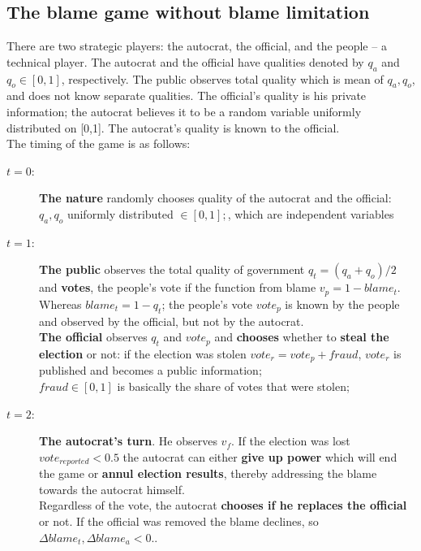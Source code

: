 \documentclass[a4paper, 12pt]{article}
\begin{document}
    \subsection*{The blame game without blame limitation}
	There are two strategic players: the autocrat, the official, and the people -- a technical player. The autocrat and the official have qualities denoted by $q_a$ and $q_o \in [0,1]$, respectively. 
    The public observes total quality which is mean of $q_a, q_o$, and does not know separate qualities. The official's quality is his private information; the autocrat believes it to be a random variable uniformly distributed on [0,1]. The autocrat's quality is known to the official.\\
	The timing of the game is as follows:
	\begin{description}
	    \item[$t = 0$:] {\textbf{The nature} randomly chooses quality of the autocrat and the official: $q_a, q_o$ uniformly distributed $\in [0,1];$, which are independent variables}
	    
	    \item[$t = 1$:] { \textbf{The public} observes the total quality of government $q_t = (q_a +q_o) /2$ and \textbf{votes}, the people's vote if the function from blame $v_p = 1-blame_t$. Whereas $blame_t = 1 - q_t$; the people's vote $vote_p$ is known by the people and observed by the official, but not by the autocrat.\\
	    \textbf{The official} observes $q_t$ and $vote_p$ and \textbf{chooses} whether to \textbf{steal the election} or not: if the election was stolen $vote_r = vote_p + fraud$, $vote_r$ is published and becomes a public information;\\
	    $fraud \in [0,1]$ is basically the share of votes that were stolen;}
	    
	    \item[$t = 2$:] {\textbf{The autocrat's turn}. He observes $v_f$. If the election was lost $vote_{reported} < 0.5$ the autocrat can either \textbf{give up power} which will end the game or \textbf{annul election results}, thereby addressing the blame towards the autocrat himself.\\
	    Regardless of the vote, the autocrat \textbf{chooses if he replaces the official} or not. If the official was removed the blame declines, so $\Delta blame_t, \Delta blame_a < 0$.}.
    
	\end{description}
	
\end{document}
